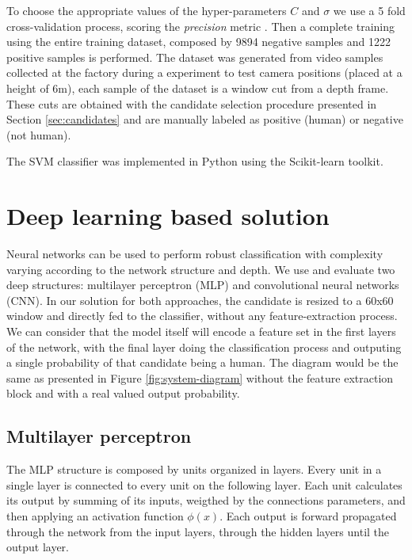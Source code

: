       To choose the appropriate values of the hyper-parameters $C$ and $\sigma$ we use a 5 fold cross-validation process, scoring the \textit{precision} metric \cite{evaluationMetrics}. Then a complete training using the entire training dataset, composed by 9894 negative samples and 1222 positive samples is performed. The dataset was generated from video samples collected at the factory during a experiment to test camera positions (placed at a height of 6m), each sample of the dataset is a window cut from a depth frame. These cuts are obtained with the candidate selection procedure presented in Section \ref{sec:candidates} and are manually labeled as positive (human) or negative (not human).

      The SVM classifier was implemented in Python using the Scikit-learn \cite{scikit-learn} toolkit.


\section{Deep learning based solution}
\label{sec:deep}

    Neural networks can be used to perform robust classification with complexity varying according to the network structure and depth. We use and evaluate two deep structures: multilayer perceptron (MLP) and convolutional neural networks (CNN). In our solution for both approaches, the candidate is resized to a 60x60 window and directly fed to the classifier, without any feature-extraction process. We can consider that the model itself will encode a feature set in the first layers of the network, with the final layer doing the classification process and outputing a single probability of that candidate being a human. The diagram would be the same as presented in Figure \ref{fig:system-diagram} without the feature extraction block and with a real valued output probability.

    \subsection{Multilayer perceptron}
        The MLP structure is composed by units organized in layers. Every unit in a single layer is connected to every unit on the following layer. Each unit calculates its output by summing of its inputs, weigthed by the connections parameters, and then applying an activation function $\phi(x)$. Each output is forward propagated through the network from the input layers, through the hidden layers until the output layer.

